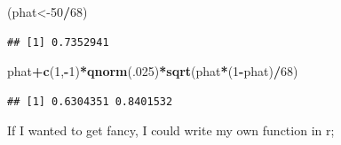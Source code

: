\documentclass[]{book}
\newenvironment{Shaded}{\begin{snugshade}}{\end{snugshade}}
\newcommand{\KeywordTok}[1]{\textcolor[rgb]{0.13,0.29,0.53}{\textbf{#1}}}
\newcommand{\DecValTok}[1]{\textcolor[rgb]{0.00,0.00,0.81}{#1}}
\newcommand{\OperatorTok}[1]{\textcolor[rgb]{0.81,0.36,0.00}{\textbf{#1}}}
\newcommand{\NormalTok}[1]{#1}
\theoremstyle{definition}
\theoremstyle{definition}
\theoremstyle{definition}
\theoremstyle{remark}
\begin{document}
\begin{Shaded}
\begin{Highlighting}[]
\NormalTok{(phat<-}\DecValTok{50}\OperatorTok{/}\DecValTok{68}\NormalTok{)}
\end{Highlighting}
\end{Shaded}

\begin{verbatim}
## [1] 0.7352941
\end{verbatim}

\begin{Shaded}
\begin{Highlighting}[]
\NormalTok{phat}\OperatorTok{+}\KeywordTok{c}\NormalTok{(}\DecValTok{1}\NormalTok{,}\OperatorTok{-}\DecValTok{1}\NormalTok{)}\OperatorTok{*}\KeywordTok{qnorm}\NormalTok{(.}\DecValTok{025}\NormalTok{)}\OperatorTok{*}\KeywordTok{sqrt}\NormalTok{(phat}\OperatorTok{*}\NormalTok{(}\DecValTok{1}\OperatorTok{-}\NormalTok{phat)}\OperatorTok{/}\DecValTok{68}\NormalTok{)}
\end{Highlighting}
\end{Shaded}

\begin{verbatim}
## [1] 0.6304351 0.8401532
\end{verbatim}

If I wanted to get fancy, I could write my own function in r;
\end{document}
